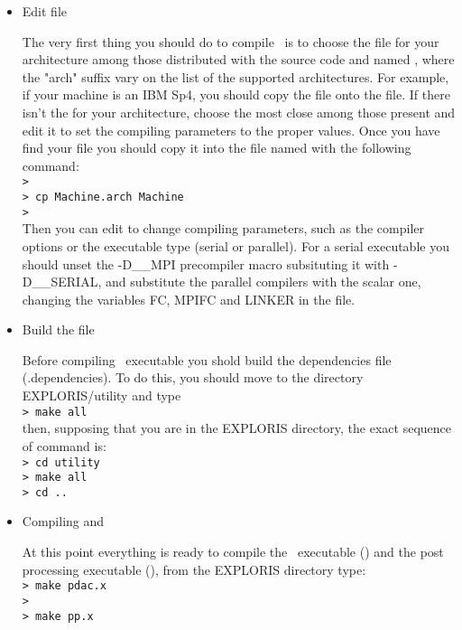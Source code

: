 \begin{itemize}

\item Edit  file

      The very first thing you should do to compile \PDAC\ is to choose
      the  file for your architecture among those distributed with
      the source code and named , where the "arch" suffix
      vary on the list of the supported architectures. For example, if
      your machine is an IBM Sp4, you should copy the file 
      onto the  file. If there isn't the  for 
      your architecture, choose the most close among those present
      and edit it to set the compiling parameters to the proper values.
      Once you have find your  file you should copy it into the
      file named  with the following command:\\
      {\tt >}\\
      {\tt > cp Machine.arch Machine}\\
      {\tt >}\\
      Then you can edit  to change compiling parameters,
      such as the compiler options or the executable type (serial or parallel).
      For a serial executable you should unset the -D\_\_MPI precompiler macro
      subsituting it with -D\_\_SERIAL, and substitute the parallel compilers
      with the scalar one, changing the variables FC, MPIFC and LINKER
      in the  file.

\item Build the  file

      Before compiling \PDAC\ executable you shold build the 
      dependencies file (.dependencies). To do this, you should
      move to the directory  EXPLORIS/utility and type \\
      {\tt > make all}\\
      then, supposing that you are in the EXPLORIS directory, 
      the exact sequence of command is:\\
      {\tt > cd utility}\\
      {\tt > make all}\\
      {\tt > cd ..}\\

\item Compiling  and 

      At this point everything is ready to compile the \PDAC\ executable
      () and the post processing executable (), from
      the EXPLORIS directory type:\\
      {\tt > make pdac.x}\\
      {\tt >}\\
      {\tt > make pp.x}\\


\end{itemize}
